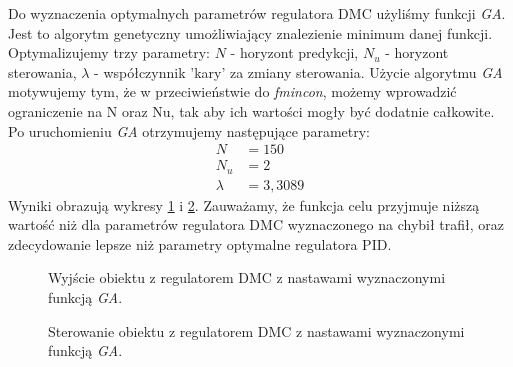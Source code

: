 Do wyznaczenia optymalnych parametrów regulatora DMC użyliśmy funkcji \emph{GA}. Jest to algorytm genetyczny umożliwiający znalezienie minimum danej funkcji. Optymalizujemy trzy parametry:
$N$ - horyzont predykcji,
$N_u$ - horyzont sterowania,
$\lambda$ - współczynnik 'kary' za zmiany sterowania.
Użycie algorytmu \emph{GA} motywujemy tym, że w przeciwieństwie do \emph{fmincon}, możemy wprowadzić ograniczenie na N oraz Nu, tak aby ich wartości mogły być dodatnie całkowite.
Po uruchomieniu \emph{GA} otrzymujemy następujące parametry:
\begin{align}
  N &= 150 \nonumber \\
  N_u &= 2 \\
  \lambda &= 3,3089 \nonumber
\end{align}
Wyniki obrazują wykresy \ref{fig:optim_dmc_out} i \ref{fig:optim_dmc_ster}.
Zauważamy, że funkcja celu przyjmuje niższą wartość niż dla parametrów regulatora DMC wyznaczonego na chybił trafił, oraz zdecydowanie lepsze niż parametry optymalne regulatora PID.

\begin{figure}[tb]
\centering
{}
\caption{Wyjście obiektu z regulatorem DMC z nastawami wyznaczonymi funkcją \emph{GA}.}
\label{fig:optim_dmc_out}
\end{figure}

\begin{figure}[tb]
\centering
{}
\caption{Sterowanie obiektu z regulatorem DMC z nastawami wyznaczonymi funkcją \emph{GA}.}
\label{fig:optim_dmc_ster}
\end{figure}

